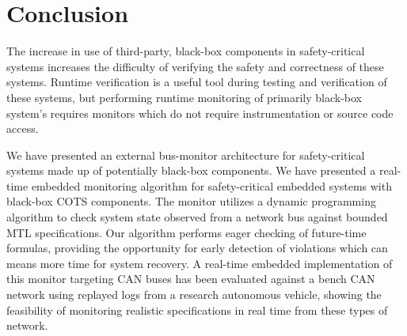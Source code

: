 
\section{Conclusion}
The increase in use of third-party, black-box components in safety-critical systems increases the difficulty of verifying the safety and correctness of these systems. Runtime verification is a useful tool during testing and verification of these systems, but performing runtime monitoring of primarily black-box system's requires monitors which do not require instrumentation or source code access.

We have presented an external bus-monitor architecture for safety-critical systems made up of potentially black-box components. 
We have presented a real-time embedded monitoring algorithm for safety-critical embedded systems with black-box COTS components. The monitor utilizes a dynamic programming algorithm to check system state observed from a network bus against bounded MTL specifications.
Our algorithm \monitor performs eager checking of future-time formulas, providing the opportunity for early detection of violations which can means more time for system recovery.
%
A real-time embedded implementation of this monitor targeting CAN buses has been evaluated against a bench CAN network using replayed logs from a research autonomous vehicle, showing the feasibility of monitoring realistic specifications in real time from these types of network.
